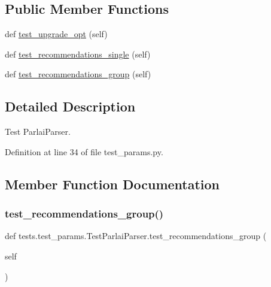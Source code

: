 \subsection*{Public Member Functions}
\begin{DoxyCompactItemize}
\item 
def \hyperlink{classtests_1_1test__params_1_1TestParlaiParser_acf8ab1cdd831a5743f56623c0af87d5e}{test\+\_\+upgrade\+\_\+opt} (self)
\item 
def \hyperlink{classtests_1_1test__params_1_1TestParlaiParser_aa34d539da2370132f7a4974008422f55}{test\+\_\+recommendations\+\_\+single} (self)
\item 
def \hyperlink{classtests_1_1test__params_1_1TestParlaiParser_af137ef0fe576f22f6bee508bd52b2b86}{test\+\_\+recommendations\+\_\+group} (self)
\end{DoxyCompactItemize}


\subsection{Detailed Description}
\begin{DoxyVerb}Test ParlaiParser.
\end{DoxyVerb}
 

Definition at line 34 of file test\+\_\+params.\+py.



\subsection{Member Function Documentation}
\mbox{\label{classtests_1_1test__params_1_1TestParlaiParser_af137ef0fe576f22f6bee508bd52b2b86}} 
\subsubsection{\texorpdfstring{test\+\_\+recommendations\+\_\+group()}{test\_recommendations\_group()}}
{\footnotesize\ttfamily def tests.\+test\+\_\+params.\+Test\+Parlai\+Parser.\+test\+\_\+recommendations\+\_\+group (\begin{DoxyParamCaption}\item[{}]{self }\end{DoxyParamCaption})}

